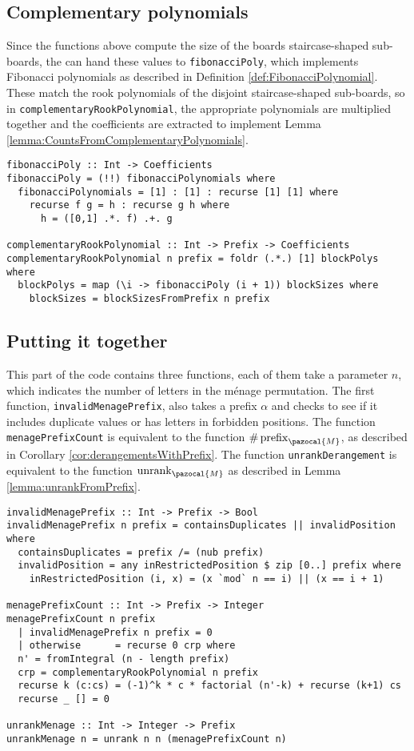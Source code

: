 \subsection{Complementary polynomials}
Since the functions above compute the size of the boards staircase-shaped
sub-boards, the can hand these values to \texttt{fibonacciPoly}, which
implements Fibonacci polynomials as described in
Definition \ref{def:FibonacciPolynomial}. These match the rook polynomials of
the disjoint staircase-shaped sub-boards, so in
\texttt{complementaryRookPolynomial}, the appropriate polynomials are multiplied
together and the coefficients are extracted to implement
Lemma \ref{lemma:CountsFromComplementaryPolynomials}.
\begin{singlespace}\begin{verbatim}
fibonacciPoly :: Int -> Coefficients
fibonacciPoly = (!!) fibonacciPolynomials where
  fibonacciPolynomials = [1] : [1] : recurse [1] [1] where
    recurse f g = h : recurse g h where
      h = ([0,1] .*. f) .+. g

complementaryRookPolynomial :: Int -> Prefix -> Coefficients
complementaryRookPolynomial n prefix = foldr (.*.) [1] blockPolys where
  blockPolys = map (\i -> fibonacciPoly (i + 1)) blockSizes where
    blockSizes = blockSizesFromPrefix n prefix
\end{verbatim}\end{singlespace}

\subsection{Putting it together}
This part of the code contains three functions, each of them take a parameter
$n$, which indicates the number of letters in the m\'enage permutation.
The first function, \texttt{invalidMenagePrefix}, also takes a prefix
$\alpha$ and checks to see if it includes duplicate values or has
letters in forbidden positions.
The function \texttt{menagePrefixCount}
is equivalent to the function $\#\operatorname{prefix}_\pazocal{M}$,
as described in Corollary \ref{cor:derangementsWithPrefix}.
The function \texttt{unrankDerangement} is equivalent to the function
$\operatorname{unrank}_\pazocal{M}$ as described in
Lemma \ref{lemma:unrankFromPrefix}.
\begin{singlespace}\begin{verbatim}
invalidMenagePrefix :: Int -> Prefix -> Bool
invalidMenagePrefix n prefix = containsDuplicates || invalidPosition where
  containsDuplicates = prefix /= (nub prefix)
  invalidPosition = any inRestrictedPosition $ zip [0..] prefix where
    inRestrictedPosition (i, x) = (x `mod` n == i) || (x == i + 1)

menagePrefixCount :: Int -> Prefix -> Integer
menagePrefixCount n prefix
  | invalidMenagePrefix n prefix = 0
  | otherwise      = recurse 0 crp where
  n' = fromIntegral (n - length prefix)
  crp = complementaryRookPolynomial n prefix
  recurse k (c:cs) = (-1)^k * c * factorial (n'-k) + recurse (k+1) cs
  recurse _ [] = 0

unrankMenage :: Int -> Integer -> Prefix
unrankMenage n = unrank n n (menagePrefixCount n)
\end{verbatim}\end{singlespace}

